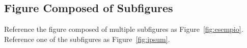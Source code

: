 \documentclass[
10pt, %
a4paper, %
oneside, %
headinclude,footinclude, %
BCOR5mm, %
]{scrartcl}
\begin{document}

\subsection{Figure Composed of Subfigures}

Reference the figure composed of multiple subfigures as Figure~\vref{fig:esempio}. Reference one of the subfigures as Figure~\vref{fig:ipsum}. %

\lipsum[15-18] %



\renewcommand{\refname}{\spacedlowsmallcaps{References}} %




\end{document}
